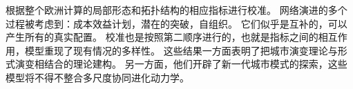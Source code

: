 {根据整个欧洲计算的局部形态和拓扑结构的相应指标进行校准。%
网络演进的多个过程被考虑到：成本效益计划，潜在的突破，自组织。 它们似乎是互补的，可以产生所有的真实配置。%
校准也是按照第二顺序进行的，也就是指标之间的相互作用，模型重现了现有情况的多样性。%
这些结果一方面表明了把城市演变理论与形式演变相结合的理论建构。 另一方面，他们开辟了新一代城市模式的探索，这些模型将不得不整合多尺度协同进化动力学。%
}















